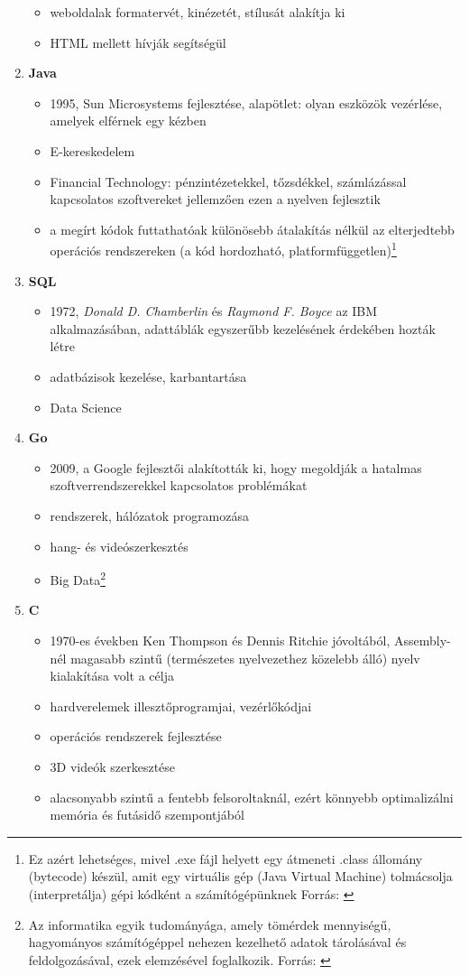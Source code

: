 \documentclass[tocnopagenum]{thesis-ekf}
\theoremstyle{definition}
\theoremstyle{remark}
\begin{document}
\begin{enumerate}
\begin{itemize}
			\item weboldalak formatervét, kinézetét, stílusát alakítja ki
			\item HTML mellett hívják segítségül
		\end{itemize}
		\item \textbf{Java}
		\begin{itemize}
			\item 1995, Sun Microsystems fejlesztése, alapötlet: olyan eszközök vezérlése, amelyek elférnek egy kézben
			\item E-kereskedelem
			\item Financial Technology: pénzintézetekkel, tőzsdékkel, számlázással kapcsolatos szoftvereket jellemzően ezen a nyelven fejlesztik
			\item a megírt kódok futtathatóak különösebb átalakítás nélkül az elterjedtebb operációs rendszereken (a kód hordozható, platformfüggetlen)\footnote{Ez azért lehetséges, mivel .exe fájl helyett egy átmeneti .class állomány (bytecode) készül, amit egy virtuális gép (Java Virtual Machine) tolmácsolja (interpretálja) gépi kódként a számítógépünknek
			Forrás: \cite{jvm}}
		\end{itemize}
		\item \textbf{SQL}
		\begin{itemize}
			\item 1972, \textit{Donald D. Chamberlin} és \textit{Raymond F. Boyce} az IBM alkalmazásában, adattáblák egyszerűbb kezelésének érdekében hozták létre
			\item adatbázisok kezelése, karbantartása
			\item Data Science
		\end{itemize}
		\item \textbf{Go}
		\begin{itemize}
			\item 2009, a Google fejlesztői alakították ki, hogy megoldják a hatalmas szoftverrendszerekkel kapcsolatos problémákat
			\item rendszerek, hálózatok programozása
			\item hang- és videószerkesztés
			\item Big Data\footnote{Az informatika egyik tudományága, amely tömérdek mennyiségű, hagyományos számítógéppel nehezen kezelhető adatok tárolásával és feldolgozásával, ezek elemzésével foglalkozik.
			Forrás: \cite{bigdata}}
		\end{itemize}
		\item \textbf{C}
		\begin{itemize}
			\item 1970-es években Ken Thompson és Dennis Ritchie jóvoltából, Assembly-nél magasabb szintű (természetes nyelvezethez közelebb álló) nyelv kialakítása volt a célja
			\item hardverelemek illesztőprogramjai, vezérlőkódjai
			\item operációs rendszerek fejlesztése
			\item 3D videók szerkesztése
			\item alacsonyabb szintű a fentebb felsoroltaknál, ezért könnyebb optimalizálni memória és futásidő szempontjából
			\cite{clang1}
		\end{itemize}
	\end{enumerate}
\end{document}
